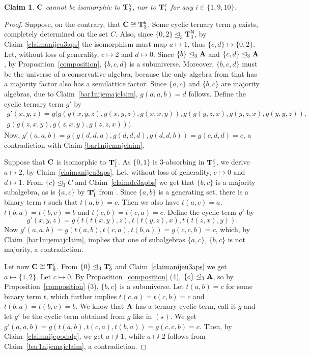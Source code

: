 \documentclass[11pt]{amsart}
\newcommand{\m}[1]{\mathbf{\uppercase{#1}}}
\newcommand{\n}{\scriptscriptstyle{\mathsf{N}}}
\newcommand{\co}{\scriptscriptstyle{\mathsf{C}}}
\theoremstyle{definition}
\theoremstyle{remark}
\theoremstyle{plain}
\newtheorem{claim}[thm]{Claim}
\def\T{\mathbf{T}}
\begin{document}
\begin{claim}
    $\m c$ cannot be isomorphic to $\m t_3^{\n}$, nor to $\m t_i^{\co}$ for any $i\in\{1,9,10\}$.
\end{claim}
\begin{proof}
Suppose, on the contrary, that $\m c\cong \m t_3^{\n}$. Some cyclic ternary term $g$ exists, completely determined on the set $C$. Also, since $\{0,2\}\trianglelefteq_3\T_3^{\n}$, by Claim~\ref{claimanijeu3aps} the isomorphism must map $a\mapsto 1$, thus $\{c,d\}\mapsto\{0,2\}$. Let, without loss of generality, $c\mapsto 2$ and $d\mapsto 0$. Since $\{b\}\trianglelefteq_3\m a$ and $\{c,d\}\trianglelefteq_3\m a$, by Proposition~\ref{composition}, $\{b,c,d\}$ is a subuniverse. Moreover, $\{b,c,d\}$ must be the universe of a conservative algebra, because the only algebra from  that has a majority factor also has a semilattice factor. Since $\{a,c\}$ and $\{b,c\}$ are majority algebras, due to Claim~\ref{bar1nijemajclaim}, $g(a,a,b)=d$ follows. Define the cyclic ternary term $g'$ by 
\[
\begin{gathered}
g'(x,y,z)=g(g(g(x,y,z),g(x,y,z),g(x,x,y)),g(g(y,z,x),g(y,z,x),g(y,y,z)),\\
g(g(z,x,y),g(z,x,y),g(z,z,x))).
\end{gathered}
\]
Now, $g'(a,a,b)=g(g(d,d,a),g(d,d,d),g(d,d,b))=g(c,d,d)=c$, a contradiction with Claim \ref{bar1nijemajclaim}.

Suppose that $\m c$ is isomorphic to $\m t_1^{\co}$. As $\{0,1\}$ is 3-absorbing in $\m t_1^{\co}$, we derive $a\mapsto 2$, by Claim~\ref{claimanijeu3aps}. Let, without loss of generality, $c\mapsto 0$ and $d\mapsto 1$. From $\{c\}\trianglelefteq_3 C$ and Claim~\ref{claimde3apbs} we get that $\{b,c\}$ is a majority subalgebra, as is $\{a,c\}$ by $\m t_1^{\co}$ from . Since $\{a,b\}$ is a generating set, there is a binary term $t$ such that $t(a,b)=c$. Then we also have $t(a,c)=a$, $t(b,a)=t(b,c)=b$ and $t(c,b)=t(c,a)=c$. Define the cyclic term $g'$ by 
\begin{equation*}\tag{$\star$}
g'(x,y,z)=g(t(t(x,y),z),t(t(y,z),x),t(t(z,x),y)).
\end{equation*}
 Now $g'(a,a,b)=g(t(a,b),t(c,a),t(b,a))=g(c,c,b)=c$, which, by Claim~\ref{bar1nijemajclaim}, implies that one of subalgebras $\{a,c\}$, $\{b,c\}$ is not majority, a contradiction.

Let now $\m c\cong\m t_9^{\co}$. From $\{0\}\trianglelefteq_3\m t_9^{\co}$ and  Claim~\ref{claimanijeu3aps} we get $a\mapsto\{1,2\}$. Let $c\mapsto 0$. By Proposition~\ref{composition} (4), $\{c\}\trianglelefteq_3\m a$, so by Proposition~\ref{composition} (3), $\{b,c\}$ is a subuniverse. Let $t(a,b)=c$ for some binary term $t$, which further implies $t(c,a)=t(c,b)=c$ and $t(b,a)=t(b,c)=b$. We know that $\m a$ has a ternary cyclic term, call it $g$ and let $g'$ be the cyclic term obtained from $g$ like in $(\star)$. We get $g'(a,a,b)=g(t(a,b),t(c,a),t(b,a))=g(c,c,b)=c$. Then, by Claim~\ref{claimnijepodalg}, we get $a\not\mapsto 1$, while $a\not\mapsto 2$ follows from Claim~\ref{bar1nijemajclaim}, a contradiction.


\end{proof}
\end{document}
